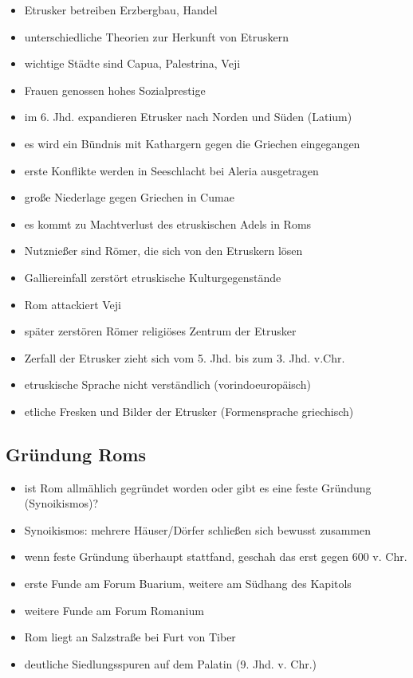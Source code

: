 \documentclass[10pt,a4paper,oneside,ngerman,numbers=noenddot]{scrartcl}
\newenvironment{myitemize}{\begin{itemize}\itemsep -9pt}{\end{itemize}} %
\begin{document}
\begin{myitemize}
    \item Etrusker betreiben Erzbergbau, Handel
    \item unterschiedliche Theorien zur Herkunft von Etruskern
    \item wichtige Städte sind Capua, Palestrina, Veji
    \item Frauen genossen hohes Sozialprestige
    \item im 6. Jhd. expandieren Etrusker nach Norden und Süden (Latium)
    \item es wird ein Bündnis mit Kathargern gegen die Griechen eingegangen
    \item erste Konflikte werden in Seeschlacht bei Aleria ausgetragen
    \item große Niederlage gegen Griechen in Cumae
    \item es kommt zu Machtverlust des etruskischen Adels in Roms
    \item Nutznießer sind Römer, die sich von den Etruskern lösen
    \item Galliereinfall zerstört etruskische Kulturgegenstände
    \item Rom attackiert Veji
    \item später zerstören Römer religiöses Zentrum der Etrusker
    \item Zerfall der Etrusker zieht sich vom 5. Jhd. bis zum 3. Jhd. v.Chr.
    \item etruskische Sprache nicht verständlich (vorindoeuropäisch)
    \item etliche Fresken und Bilder der Etrusker (Formensprache griechisch)
\end{myitemize}

\subsection*{Gründung Roms}
\begin{myitemize}
    \item ist Rom allmählich gegründet worden oder gibt es eine feste Gründung (Synoikismos)?
    \item Synoikismos: mehrere Häuser/Dörfer schließen sich bewusst zusammen
    \item wenn feste Gründung überhaupt stattfand, geschah das erst gegen 600 v. Chr.
    \item erste Funde am Forum Buarium, weitere am Südhang des Kapitols
    \item weitere Funde am Forum Romanium
    \item Rom liegt an Salzstraße bei Furt von Tiber
    \item deutliche Siedlungsspuren auf dem Palatin (9. Jhd. v. Chr.)
\end{myitemize}
\end{document}
